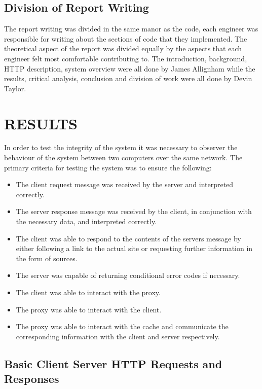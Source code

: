 \documentclass[10pt,twocolumn]{witseiepaper}
\begin{document}
	\subsection{Division of Report Writing}
	
		The report writing was divided in the same manor as the code, each engineer was responsible for writing about the sections of code that they implemented. The theoretical aspect of the report was divided equally by the aspects that each engineer felt most comfortable contributing to. The introduction, background, HTTP description, system overview were all done by James Allignham while the results, critical analysis, conclusion and division of work were all done by Devin Taylor.
	

\section{RESULTS}

	In order to test the integrity of the system it was necessary to observer the behaviour of the system between two computers over the same network. The primary criteria for testing the system was to ensure the following:

	\begin{itemize}
		\item The client request message was received by the server and interpreted correctly.
		\item The server response message was received by the client, in conjunction with the necessary data, and interpreted correctly.
		\item The client was able to respond to the contents of the servers message by either following a link to the actual site or requesting further information in the form of sources.
		\item The server was capable of returning conditional error codes if necessary.
		\item The client was able to interact with the proxy.
		\item The proxy was able to interact with the client.
		\item The proxy was able to interact with the cache and communicate the corresponding information with the client and server respectively.
	\end{itemize}

	\subsection{Basic Client Server HTTP Requests and Responses} %
	\label{sub:basic_client_server}
		
\end{document}
